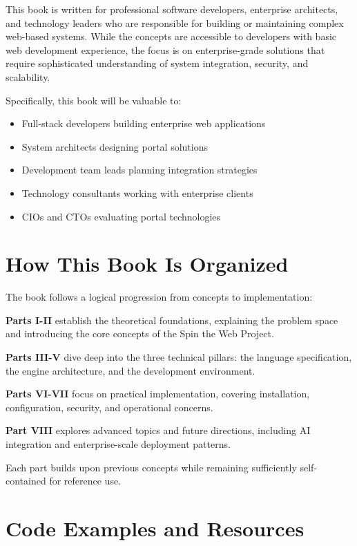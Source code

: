 This book is written for professional software developers, enterprise architects, and technology leaders who are responsible for building or maintaining complex web-based systems. While the concepts are accessible to developers with basic web development experience, the focus is on enterprise-grade solutions that require sophisticated understanding of system integration, security, and scalability.

Specifically, this book will be valuable to:
\begin{itemize}
\item Full-stack developers building enterprise web applications
\item System architects designing portal solutions
\item Development team leads planning integration strategies
\item Technology consultants working with enterprise clients
\item CIOs and CTOs evaluating portal technologies
\end{itemize}

\section*{How This Book Is Organized}

The book follows a logical progression from concepts to implementation:

\textbf{Parts I-II} establish the theoretical foundations, explaining the problem space and introducing the core concepts of the Spin the Web Project.

\textbf{Parts III-V} dive deep into the three technical pillars: the \wbdl language specification, the \webspinner engine architecture, and the \studio development environment.

\textbf{Parts VI-VII} focus on practical implementation, covering installation, configuration, security, and operational concerns.

\textbf{Part VIII} explores advanced topics and future directions, including AI integration and enterprise-scale deployment patterns.

Each part builds upon previous concepts while remaining sufficiently self-contained for reference use.

\section*{Code Examples and Resources}

